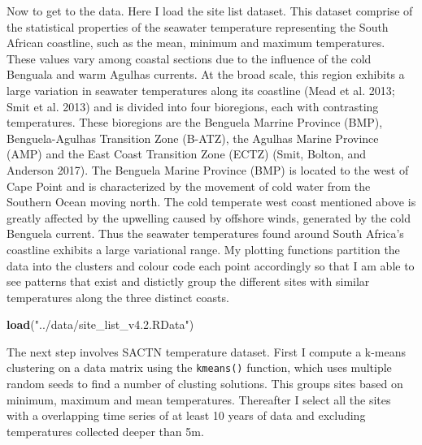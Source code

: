 \documentclass[10pt,A4,]{article}
\newenvironment{Shaded}{\begin{snugshade}}{\end{snugshade}}
\newcommand{\KeywordTok}[1]{\textcolor[rgb]{0.13,0.29,0.53}{\textbf{#1}}}
\newcommand{\StringTok}[1]{\textcolor[rgb]{0.31,0.60,0.02}{#1}}
\newcommand{\NormalTok}[1]{#1}
\begin{document}
Now to get to the data. Here I load the site list dataset. This dataset
comprise of the statistical properties of the seawater temperature
representing the South African coastline, such as the mean, minimum and
maximum temperatures. These values vary among coastal sections due to
the influence of the cold Benguala and warm Agulhas currents. At the
broad scale, this region exhibits a large variation in seawater
temperatures along its coastline (Mead et al. 2013; Smit et al. 2013)
and is divided into four bioregions, each with contrasting temperatures.
These bioregions are the Benguela Marrine Province (BMP),
Benguela-Agulhas Transition Zone (B-ATZ), the Agulhas Marine Province
(AMP) and the East Coast Transition Zone (ECTZ) (Smit, Bolton, and
Anderson 2017). The Benguela Marine Province (BMP) is located to the
west of Cape Point and is characterized by the movement of cold water
from the Southern Ocean moving north. The cold temperate west coast
mentioned above is greatly affected by the upwelling caused by offshore
winds, generated by the cold Benguela current. Thus the seawater
temperatures found around South Africa's coastline exhibits a large
variational range. My plotting functions partition the data into the
clusters and colour code each point accordingly so that I am able to see
patterns that exist and distictly group the different sites with similar
temperatures along the three distinct coasts.

\begin{Shaded}
\begin{Highlighting}[]
\KeywordTok{load}\NormalTok{(}\StringTok{"../data/site_list_v4.2.RData"}\NormalTok{)}
\end{Highlighting}
\end{Shaded}

\newpage

The next step involves SACTN temperature dataset. First I compute a
k-means clustering on a data matrix using the \texttt{kmeans()}
function, which uses multiple random seeds to find a number of clusting
solutions. This groups sites based on minimum, maximum and mean
temperatures. Thereafter I select all the sites with a overlapping time
series of at least 10 years of data and excluding temperatures collected
deeper than 5m.
\end{document}
